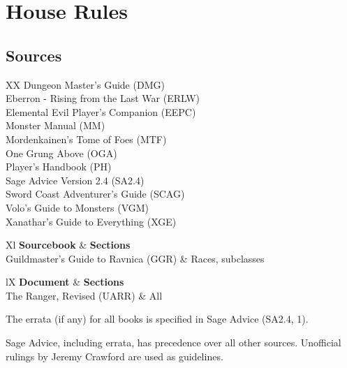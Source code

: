 \documentclass[letterpaper,twocolumn,openany,nodeprecatedcode]{dndbook}
\begin{document}
\tableofcontents

\chapter{House Rules}

\section{Sources}

\begin{DndTable}[header=Sourcebooks]{XX}
    Dungeon Master's Guide (DMG) \\
    Eberron - Rising from the Last War (ERLW) \\
    Elemental Evil Player's Companion (EEPC) \\
    Monster Manual (MM) \\
    Mordenkainen's Tome of Foes (MTF) \\
    One Grung Above (OGA) \\
    Player's Handbook (PH) \\
    Sage Advice Version 2.4 (SA2.4) \\
    Sword Coast Adventurer's Guide (SCAG) \\
    Volo's Guide to Monsters (VGM) \\
    Xanathar's Guide to Everything (XGE) \\
\end{DndTable}

\begin{DndTable}[header=Sourcebooks: Partial]{Xl}
    \textbf{Sourcebook} & \textbf{Sections} \\
    Guildmaster's Guide to Ravnica (GGR) & Races, subclasses \\
\end{DndTable}

\begin{DndTable}[header=Unearthed Arcana]{lX}
    \textbf{Document} & \textbf{Sections} \\
    The Ranger, Revised (UARR) & All \\
\end{DndTable}

The errata (if any) for all books is specified in Sage Advice (SA2.4, 1).

Sage Advice, including errata, has precedence over all other sources. Unofficial rulings by Jeremy Crawford are used as guidelines.
\end{document}
